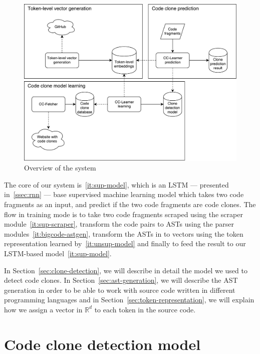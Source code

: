 \begin{figure}
  \centering\includegraphics[width=13cm]{./images/system-overview.pdf}
  \caption{\label{fig:system-overview}Overview of the system}
\end{figure}

The core of our system is~\ref{it:sup-model}, which is an LSTM --- presented
in~\ref{ssec:rnn} --- base supervised machine learning model which takes two
code fragments as an input, and predict if the two code fragments are code
clones. The flow in training mode is to take two code fragments scraped
using the scraper module~\ref{it:sup-scraper}, transform the code pairs to ASTs
using the parser modules~\ref{it:bigcode-astgen}, transform the ASTs in to
vectors using the token representation learned by~\ref{it:unsup-model} and
finally to feed the result to our LSTM-based model~\ref{it:sup-model}.

In Section~\ref{sec:clone-detection}, we will describe in detail the model we
used to detect code clones. In Section~\ref{sec:ast-generation}, we will
describe the AST generation in order to be able to work with source code written
in different programming languages and in
Section~\ref{sec:token-representation}, we will explain how we assign a vector
in $\mathbb{R}^d$ to each token in the source code.
%
\section{\label{sec:clone-detection}Code clone detection model}
